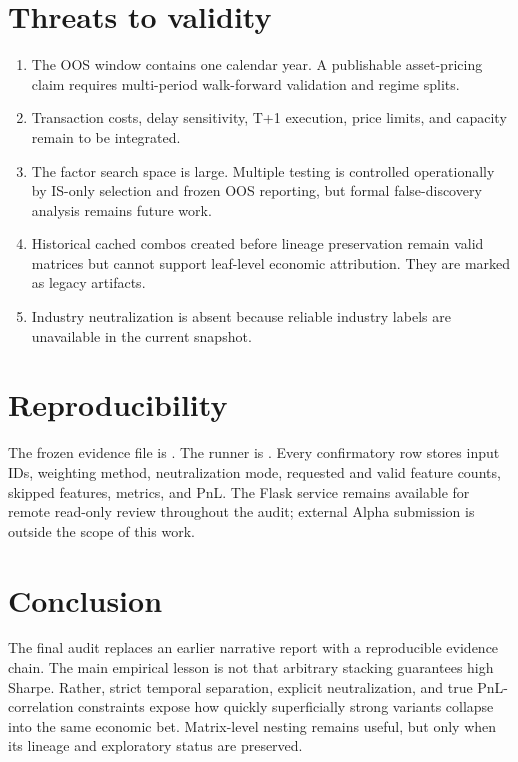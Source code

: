 \documentclass[10pt,a4paper]{article}
\begin{document}
\section{Threats to validity}
\begin{enumerate}
\item The OOS window contains one calendar year. A publishable asset-pricing claim requires multi-period
walk-forward validation and regime splits.
\item Transaction costs, delay sensitivity, T+1 execution, price limits, and capacity remain to be integrated.
\item The factor search space is large. Multiple testing is controlled operationally by IS-only selection and
frozen OOS reporting, but formal false-discovery analysis remains future work.
\item Historical cached combos created before lineage preservation remain valid matrices but cannot support
leaf-level economic attribution. They are marked as legacy artifacts.
\item Industry neutralization is absent because reliable industry labels are unavailable in the current snapshot.
\end{enumerate}

\section{Reproducibility}
The frozen evidence file is . The runner is
. Every confirmatory row stores input IDs, weighting method,
neutralization mode, requested and valid feature counts, skipped features, metrics, and PnL. The Flask service
remains available for remote read-only review throughout the audit; external Alpha submission is outside the
scope of this work.

\section{Conclusion}
The final audit replaces an earlier narrative report with a reproducible evidence chain. The main empirical
lesson is not that arbitrary stacking guarantees high Sharpe. Rather, strict temporal separation, explicit
neutralization, and true PnL-correlation constraints expose how quickly superficially strong variants collapse
into the same economic bet. Matrix-level nesting remains useful, but only when its lineage and exploratory
status are preserved.
\end{document}
